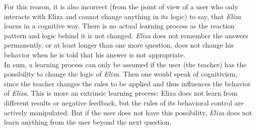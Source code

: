 \documentclass[12pt,a4paper]{article}
\begin{document}
{For this reason, it is also incorrect (from the point of view of a user who only interacts with Eliza and cannot change anything in its logic) to say, that \textit{Eliza} learns in a cognitive way. There is no actual learning process as the reaction pattern and logic behind it is not changed. \textit{Eliza} does not remember the answers permanently, or at least longer than one more question, does not change his behavior when he is told that his answer is not appropriate.\\

In sum, a learning process can only be assumed if the user (the teacher) has the possibility to change the logic of \textit{Eliza}. Then one would speak of cognitivism, since the teacher changes the rules to be applied and thus influences the behavior of \textit{Eliza}. This is more an extrinsic learning process: Eliza does not learn from different results or negative feedback, but the rules of its behavioral control are actively manipulated. But if the user does not have this possibility, \textit{Eliza} does not learn anything from the user beyond the next question. 
}
\end{document}
